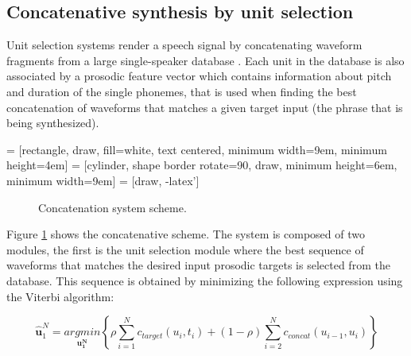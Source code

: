\subsection{Concatenative synthesis by unit selection} \label{sec:concat}

Unit selection systems render a speech signal by concatenating waveform fragments from a large single-speaker database \cite{hunt1996unit}. Each unit in the database is also associated by a prosodic feature vector which contains information about pitch and duration of the single phonemes, that is used when finding the best concatenation of waveforms that matches a given target input (the phrase that is being synthesized).

 = [rectangle, draw, fill=white, text centered, minimum width=9em, minimum height=4em]
 = [cylinder, shape border rotate=90, draw, minimum height=6em, minimum width=9em]
 = [draw, -latex']

\begin{figure}[h]
    \centering
    \caption{Concatenation system scheme.}
    \label{fig:concat-sys}
\end{figure}

Figure \ref{fig:concat-sys} shows the concatenative scheme. The system is composed of two modules, the first is the unit selection module where the best sequence of waveforms that matches the desired input prosodic targets is selected from the database. This sequence is obtained by minimizing the following expression using the Viterbi algorithm:

\begin{equation}
    \mathbf{\hat{u}}_1^N = \underset{\mathbf{u_1^N}}{argmin} \left \{ \rho \sum_{i=1}^{N} c_{target} (u_i, t_i) + (1-\rho) \sum_{i=2}^{N} c_{concat} (u_{i-1}, u_i) \right \}
\end{equation}

